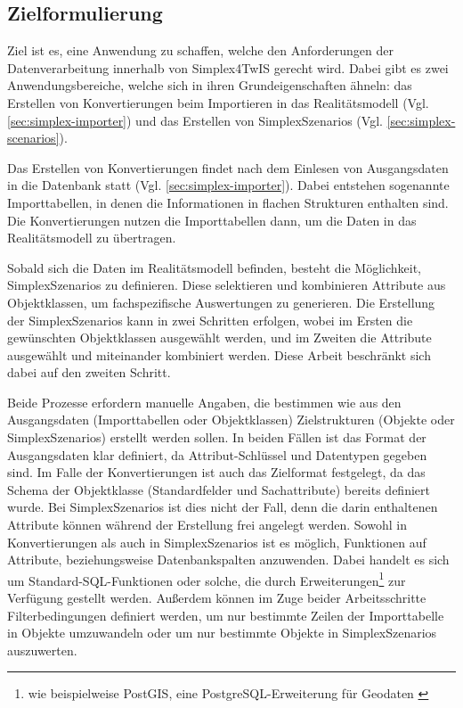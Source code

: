 \subsection{Zielformulierung}

Ziel ist es, eine Anwendung zu schaffen, welche den Anforderungen der Datenverarbeitung innerhalb von Simplex4TwIS gerecht wird. Dabei gibt es zwei Anwendungsbereiche, welche sich in ihren Grundeigenschaften ähneln: das Erstellen von Konvertierungen beim Importieren in das Realitätsmodell (Vgl. \ref{sec:simplex-importer}) und das Erstellen von SimplexSzenarios (Vgl. \ref{sec:simplex-scenarios}).

\pskip
Das Erstellen von Konvertierungen findet nach dem Einlesen von Ausgangsdaten in die Datenbank statt (Vgl. \ref{sec:simplex-importer}). Dabei entstehen sogenannte Importtabellen, in denen die Informationen in flachen Strukturen enthalten sind. Die Konvertierungen nutzen die Importtabellen dann, um die Daten in das Realitätsmodell zu übertragen.

Sobald sich die Daten im Realitätsmodell befinden, besteht die Möglichkeit, SimplexSzenarios zu definieren. Diese selektieren und kombinieren Attribute aus Objektklassen, um fachspezifische Auswertungen zu generieren. Die Erstellung der SimplexSzenarios kann in zwei Schritten erfolgen, wobei im Ersten die gewünschten Objektklassen ausgewählt werden, und im Zweiten die Attribute ausgewählt und miteinander kombiniert werden. Diese Arbeit beschränkt sich dabei auf den zweiten Schritt.

Beide Prozesse erfordern manuelle Angaben, die bestimmen wie aus den Ausgangsdaten (Importtabellen oder Objektklassen) Zielstrukturen (Objekte oder SimplexSzenarios) erstellt werden sollen. In beiden Fällen ist das Format der Ausgangsdaten klar definiert, da Attribut-Schlüssel und Datentypen gegeben sind. Im Falle der Konvertierungen ist auch das Zielformat festgelegt, da das Schema der Objektklasse (Standardfelder und Sachattribute) bereits definiert wurde. Bei SimplexSzenarios ist dies nicht der Fall, denn die darin enthaltenen Attribute können während der Erstellung frei angelegt werden. Sowohl in Konvertierungen als auch in SimplexSzenarios ist es möglich, Funktionen auf Attribute, beziehungsweise Datenbankspalten anzuwenden. Dabei handelt es sich um Standard-\ac{SQL}-Funktionen oder solche, die durch Erweiterungen\footnote{wie beispielweise PostGIS, eine PostgreSQL-Erweiterung für Geodaten \parencite{postgispscPostGIS}} zur Verfügung gestellt werden. Außerdem können im Zuge beider Arbeitsschritte Filterbedingungen definiert werden, um nur bestimmte Zeilen der Importtabelle in Objekte umzuwandeln oder um nur bestimmte Objekte in SimplexSzenarios auszuwerten.

